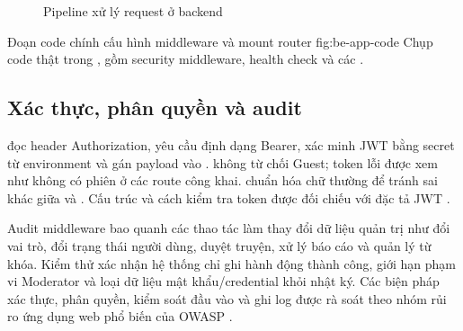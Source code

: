 \begin{figure}[H]
\centering
{}
\caption{Pipeline xử lý request ở backend}
\label{fig:backend-pipeline}
\end{figure}

  {Đoạn code chính cấu hình middleware và mount router}
  {fig:be-app-code}
  {Chụp code thật trong , gồm security middleware, health check và các .}
\clearpage
\subsection{Xác thực, phân quyền và audit}

 đọc header Authorization, yêu cầu định dạng Bearer, xác minh JWT bằng secret từ environment và gán payload vào .  không từ chối Guest; token lỗi được xem như không có phiên ở các route công khai.  chuẩn hóa chữ thường để tránh sai khác giữa  và . Cấu trúc và cách kiểm tra token được đối chiếu với đặc tả JWT \cite{rfc7519}.

Audit middleware bao quanh các thao tác làm thay đổi dữ liệu quản trị như đổi vai trò, đổi trạng thái người dùng, duyệt truyện, xử lý báo cáo và quản lý từ khóa. Kiểm thử xác nhận hệ thống chỉ ghi hành động thành công, giới hạn phạm vi Moderator và loại dữ liệu mật khẩu/credential khỏi nhật ký. Các biện pháp xác thực, phân quyền, kiểm soát đầu vào và ghi log được rà soát theo nhóm rủi ro ứng dụng web phổ biến của OWASP \cite{owasp-top10}.

